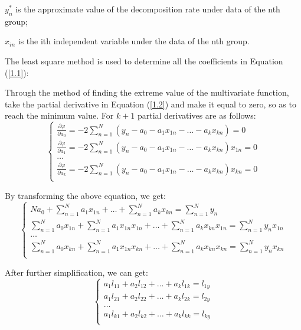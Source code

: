 $y_{n}^*$ is the approximate value of the decomposition rate under data of the nth group;

$x_{in}$ is the ith independent variable under the data of the nth group.

The least square method is used to determine all the coefficients in Equation (\ref{1.1}):

Through the method of finding the extreme value of the multivariate function, take the partial derivative in Equation (\ref{1.2}) and make it equal to zero, so as to reach the minimum value. For $k+1$ partial derivatives are as follows:
\begin{equation}\label{}
\left\{
\begin{array}{l}
    \frac{\partial \varphi}{\partial a_{0}} = -2\sum_{n = 1}^{N} (y_{n}-a_{0}-a_{1}x_{1n}-\dots-a_{k}x_{kn})=0 \\
    \frac{\partial \varphi}{\partial a_{1}} = -2\sum_{n = 1}^{N} (y_{n}-a_{0}-a_{1}x_{1n}-\dots-a_{k}x_{kn})x_{1n}=0 \\
    \dots \\
    \frac{\partial \varphi}{\partial a_{k}} = -2\sum_{n = 1}^{N} (y_{n}-a_{0}-a_{1}x_{1n}-\dots-a_{k}x_{kn})x_{kn}=0 \\
\end{array}
\right.
\end{equation}

By transforming the above equation, we get:
\begin{equation}\label{}
\left\{
\begin{array}{l}
    Na_{0}+\sum_{n = 1}^{N}a_{1}x_{1n}+\dots+\sum_{n = 1}^{N}a_{k}x_{kn}=\sum_{n = 1}^{N}y_{n} \\

    \sum_{n = 1}^{N}a_{0}x_{1n}+\sum_{n = 1}^{N}a_{1}x_{1n}x_{1n}+\dots+\sum_{n = 1}^{N}a_{k}x_{kn}x_{1n}=\sum_{n = 1}^{N}y_{n}x_{1n} \\

    \dots \\

    \sum_{n = 1}^{N}a_{0}x_{kn}+\sum_{n = 1}^{N}a_{1}x_{1n}x_{kn}+\dots+\sum_{n = 1}^{N}a_{k}x_{kn}x_{kn}=\sum_{n = 1}^{N}y_{n}x_{kn} \\
\end{array}
\right.
\end{equation}

After further simplification, we can get:
\begin{equation}\label{1.4}
\left\{
\begin{array}{l}
    a_{1}l_{11}+a_{2}l_{12}+\dots+a_{k}l_{1k}=l_{1y} \\
    a_{1}l_{21}+a_{2}l_{22}+\dots+a_{k}l_{2k}=l_{2y} \\
    \dots \\
    a_{1}l_{k1}+a_{2}l_{k2}+\dots+a_{k}l_{kk}=l_{ky} \\
\end{array}
\right.
\end{equation}

